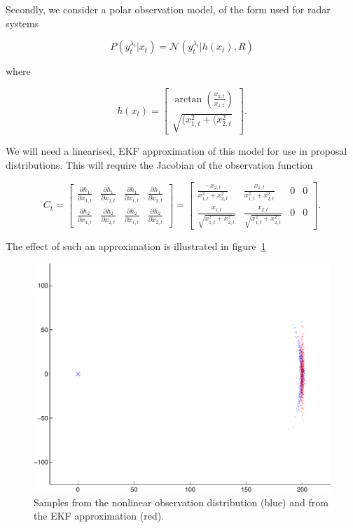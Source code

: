 Secondly, we consider a polar observation model, of the form used for radar systems

\begin{equation}
P(y_t^{\lambda_t}|x_t) = \mathcal{N}(y_t^{\lambda_t}|h(x_t), R)
\end{equation}

where

\begin{equation}
h(x_t) = \begin{bmatrix}
\arctan \left( \frac{x_{2,t}}{x_{1,t}} \right)\\
\sqrt{ (x_{1,t}^2 + (x_{2,t}^2 }
\end{bmatrix}.
\end{equation}

We will need a linearised, EKF approximation of this model for use in proposal distributions. This will require the Jacobian of the observation function

\begin{equation}
C_t = \begin{bmatrix} \frac{\partial h_1}{\partial x_{1,t}} & \frac{\partial h_1}{\partial x_{2,t}} & \frac{\partial h_1}{\partial \dot{x}_{1,t}} & \frac{\partial h_1}{\partial \dot{x}_{2,t}} \\ \frac{\partial h_2}{\partial x_{1,t}} & \frac{\partial h_2}{\partial x_{2,t}} & \frac{\partial h_2}{\partial \dot{x}_{1,t}} & \frac{\partial h_2}{\partial \dot{x}_{2,t}} \end{bmatrix}
= \begin{bmatrix} \frac{-x_{2,t}}{x_{1,t}^2 + x_{2,t}^2} & \frac{x_{1,t}}{x_{1,t}^2 + x_{2,t}^2} & 0 & 0 \\ \frac{x_{1,t}}{\sqrt{x_{1,t}^2 + x_{2,t}^2}} & \frac{x_{2,t}}{\sqrt{x_{1,t}^2 + x_{2,t}^2}} & 0 & 0 \end{bmatrix}.
\end{equation}

The effect of such an approximation is illustrated in figure~\ref{fig:EKFradar}

\begin{figure}[!hbt] \centering
\includegraphics[width=0.7\columnwidth]{EKF-crop.pdf}%
\caption{Samples from the nonlinear observation distribution (blue) and from the EKF approximation (red).}%
\label{fig:EKFradar}%
\end{figure}
